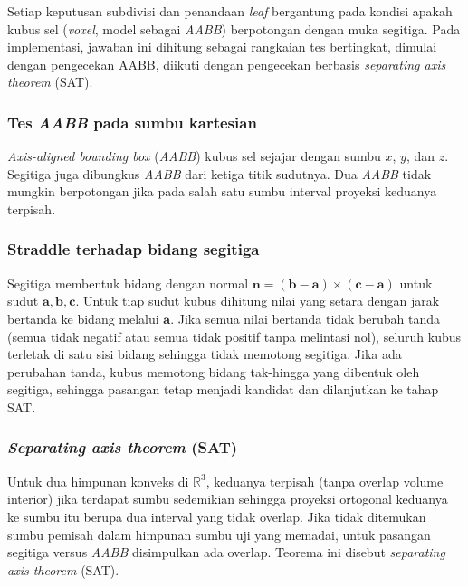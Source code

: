\documentclass[11pt,a4paper]{article}
\begin{document}
Setiap keputusan subdivisi dan penandaan \textit{leaf} bergantung pada kondisi apakah kubus sel (\textit{voxel}, model sebagai \textit{AABB}) berpotongan dengan muka segitiga. Pada implementasi, jawaban ini dihitung sebagai rangkaian tes bertingkat, dimulai dengan pengecekan AABB, diikuti dengan pengecekan berbasis \textit{separating axis theorem} (SAT).

\subsubsection{Tes \textit{AABB} pada sumbu kartesian}

\textit{Axis-aligned bounding box} (\textit{AABB}) kubus sel sejajar dengan sumbu $x$, $y$, dan $z$. Segitiga juga dibungkus \textit{AABB} dari ketiga titik sudutnya. Dua \textit{AABB} tidak mungkin berpotongan jika pada salah satu sumbu interval proyeksi keduanya terpisah.

\subsubsection{Straddle terhadap bidang segitiga}

Segitiga membentuk bidang dengan normal $\mathbf{n} = (\mathbf{b}-\mathbf{a}) \times (\mathbf{c}-\mathbf{a})$ untuk sudut $\mathbf{a},\mathbf{b},\mathbf{c}$. Untuk tiap sudut kubus dihitung nilai yang setara dengan jarak bertanda ke bidang melalui $\mathbf{a}$. Jika semua nilai bertanda tidak berubah tanda (semua tidak negatif atau semua tidak positif tanpa melintasi nol), seluruh kubus terletak di satu sisi bidang sehingga tidak memotong segitiga. Jika ada perubahan tanda, kubus memotong bidang tak-hingga yang dibentuk oleh segitiga, sehingga pasangan tetap menjadi kandidat dan dilanjutkan ke tahap SAT.

\subsubsection{\textit{Separating axis theorem} (SAT)}

Untuk dua himpunan konveks di $\mathbb{R}^3$, keduanya terpisah (tanpa overlap volume interior) jika terdapat sumbu sedemikian sehingga proyeksi ortogonal keduanya ke sumbu itu berupa dua interval yang tidak overlap. Jika tidak ditemukan sumbu pemisah dalam himpunan sumbu uji yang memadai, untuk pasangan segitiga versus \textit{AABB} disimpulkan ada overlap. Teorema ini disebut \textit{separating axis theorem} (SAT).
\end{document}
